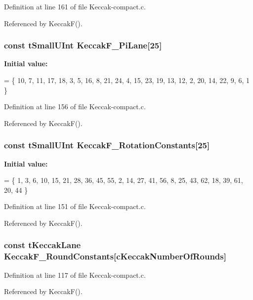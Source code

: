 Definition at line 161 of file Keccak-\/compact.\-c.



Referenced by Keccak\-F().

\hypertarget{Keccak-compact_8c_ad3deb5317a026ca237c4bb00517ed613}{
\subsubsection[{Keccak\-F\-\_\-\-Pi\-Lane}]{\setlength{\rightskip}{0pt plus 5cm}const {\bf t\-Small\-U\-Int} Keccak\-F\-\_\-\-Pi\-Lane\mbox{[}25\mbox{]}}}\label{Keccak-compact_8c_ad3deb5317a026ca237c4bb00517ed613}
{\bfseries Initial value\-:}
\begin{DoxyCode}
= 
\{
    10,  7, 11, 17, 18,  3,  5, 16,  8, 21, 24,  4, 15, 23, 19, 13, 12,  2, 20, 14, 22,  9,  6,  1 
\}
\end{DoxyCode}


Definition at line 156 of file Keccak-\/compact.\-c.



Referenced by Keccak\-F().

\hypertarget{Keccak-compact_8c_aa250efc71ed09df8e3a7da9284b68814}{
\subsubsection[{Keccak\-F\-\_\-\-Rotation\-Constants}]{\setlength{\rightskip}{0pt plus 5cm}const {\bf t\-Small\-U\-Int} Keccak\-F\-\_\-\-Rotation\-Constants\mbox{[}25\mbox{]}}}\label{Keccak-compact_8c_aa250efc71ed09df8e3a7da9284b68814}
{\bfseries Initial value\-:}
\begin{DoxyCode}
= 
\{
     1,  3,  6, 10, 15, 21, 28, 36, 45, 55,  2, 14, 27, 41, 56,  8, 25, 43, 62, 18, 39, 61, 20, 44
\}
\end{DoxyCode}


Definition at line 151 of file Keccak-\/compact.\-c.



Referenced by Keccak\-F().

\hypertarget{Keccak-compact_8c_a9c1d4eb2917662d6ced7b63d0d5b8806}{
\subsubsection[{Keccak\-F\-\_\-\-Round\-Constants}]{\setlength{\rightskip}{0pt plus 5cm}const t\-Keccak\-Lane Keccak\-F\-\_\-\-Round\-Constants\mbox{[}c\-Keccak\-Number\-Of\-Rounds\mbox{]}}}\label{Keccak-compact_8c_a9c1d4eb2917662d6ced7b63d0d5b8806}


Definition at line 117 of file Keccak-\/compact.\-c.



Referenced by Keccak\-F().


